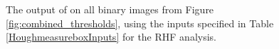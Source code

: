 \documentclass{article}
\begin{document}
\begin{figure}[H]
	        \caption{The output of  on all binary images from Figure \ref{fig:combined_thresholds}, using the inputs specified in Table \ref{HoughmeasureboxInputs} for the RHF analysis.}
	        \label{fig:RHF_results_all}
	\end{figure}
\end{document}
